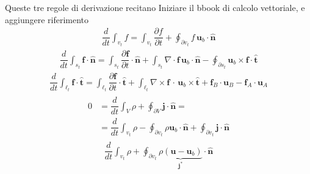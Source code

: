 \documentclass[letterpaper,10pt,italian]{jupyterBook}
\begin{document}
\sphinxAtStartPar
Queste tre regole di derivazione recitano  Iniziare il bbook di calcolo vettoriale, e aggiungere riferimento
\begin{equation*}
\begin{split}\dfrac{d}{dt} \int_{v_t} f = \int_{v_t} \dfrac{\partial f}{\partial t} + \oint_{\partial v_t} f \, \mathbf{u}_b \cdot \hat{\mathbf{n}}\end{split}
\end{equation*}\begin{equation*}
\begin{split}\dfrac{d}{dt} \int_{s_t} \mathbf{f} \cdot \hat{\mathbf{n}} = \int_{s_t} \dfrac{\partial \mathbf{f}}{\partial t} \cdot \hat{\mathbf{n}} + \int_{s_t} \nabla \cdot \mathbf{f} \, \mathbf{u}_b \cdot \hat{\mathbf{n}} - \oint_{\partial s_t} \mathbf{u}_b \times \mathbf{f} \cdot \hat{\mathbf{t}}\end{split}
\end{equation*}\begin{equation*}
\begin{split}\dfrac{d}{dt} \int_{\ell_t} \mathbf{f} \cdot \hat{\mathbf{t}} = \int_{\ell_t} \dfrac{\partial \mathbf{f}}{\partial t} \cdot \hat{\mathbf{t}} + \int_{\ell_t} \nabla \times \mathbf{f} \, \cdot \, \mathbf{u}_b \times \hat{\mathbf{t}} + \mathbf{f}_B \cdot \mathbf{u}_B - \mathbf{f}_A \cdot \mathbf{u}_A\end{split}
\end{equation*}
\sphinxAtStartPar
{}
\begin{equation*}
\begin{split}\begin{aligned}
   0 & = \dfrac{d}{dt} \int_{V} \rho + \oint_{\partial V} \mathbf{j} \cdot \hat{\mathbf{n}} = \\
   & = \dfrac{d}{dt} \int_{v_t} \rho - \oint_{\partial v_t } \rho \mathbf{u}_b \cdot \hat{\mathbf{n}} + \oint_{\partial v_t} \mathbf{j} \cdot \hat{\mathbf{n}} 
\end{aligned}\end{split}
\end{equation*}\begin{equation*}
\begin{split}
    \dfrac{d}{dt} \int_{v_t} \rho + \oint_{\partial v_t} \underbrace{\rho (\mathbf{u} - \mathbf{u}_b)}_{\mathbf{j}^*} \cdot \hat{\mathbf{n}} 
\end{split}
\end{equation*}
\sphinxAtStartPar
\end{document}
